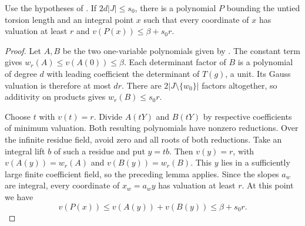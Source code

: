 \begin{lemma}
\label{lem:c-selmer-line-point}
\emitthmsource
Use the hypotheses of .
If $2d|J|\le s_0$, there is a polynomial $P$ bounding the untied torsion length and an integral point $x$ such that every coordinate of $x$ has valuation at least $r$ and $v(P(x))\le\beta+s_0 r$.
\end{lemma}
\begin{proof}
Let $A,B$ be the two one-variable polynomials given by .
The constant term gives $w_r(A)\le v(A(0))\le\beta$.
Each determinant factor of $B$ is a polynomial of degree $d$ with leading coefficient the determinant of $T(g)$, a unit. Its Gauss valuation is therefore at most $dr$.
There are $2|J\setminus\{w_0\}|$ factors altogether, so additivity on products gives $w_r(B)\le s_0r$.

Choose $t$ with $v(t)=r$. Divide $A(tY)$ and $B(tY)$ by respective coefficients of minimum valuation. Both resulting polynomials have nonzero reductions.
Over the infinite residue field, avoid zero and all roots of both reductions. Take an integral lift $b$ of such a residue and put $y=tb$. Then $v(y)=r$, with $v(A(y))=w_r(A)$ and $v(B(y))=w_r(B)$.
This $y$ lies in a sufficiently large finite coefficient field, so the preceding lemma applies.
Since the slopes $a_w$ are integral, every coordinate of $x_w=a_wy$ has valuation at least $r$. At this point we have
\[
 v(P(x))\le v(A(y))+v(B(y))\le\beta+s_0r .
\]
\end{proof}

